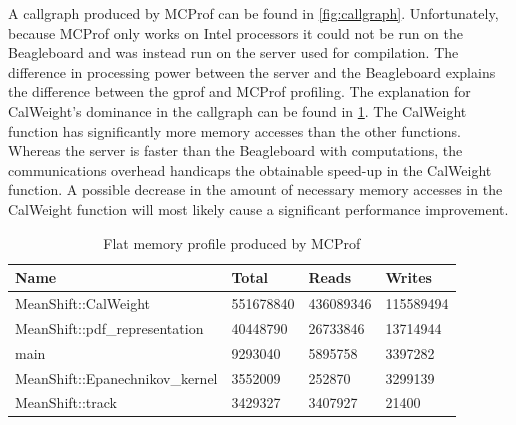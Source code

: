 \documentclass[final]{article}
\begin{document}
A callgraph produced by MCProf can be found in \cref{fig:callgraph}. Unfortunately, because MCProf only works on Intel processors it could not be run on the Beagleboard and was instead run on the server used for compilation. The difference in processing power between the server and the Beagleboard explains the difference between the gprof and MCProf profiling. The explanation for CalWeight's dominance in the callgraph can be found in \cref{tab:memprofile}. The CalWeight function has significantly more memory accesses than the other functions. Whereas the server is faster than the Beagleboard with computations, the communications overhead handicaps the obtainable speed-up in the CalWeight function. A possible decrease in the amount of necessary memory accesses in the CalWeight function will most likely cause a significant performance improvement.

\begin{table}[H]
\centering
\caption{Flat memory profile produced by MCProf}
\label{tab:memprofile}
\begin{tabular}{llll}
\toprule
\textbf{Name} & \textbf{Total} & \textbf{Reads} & \textbf{Writes}\\
\midrule
MeanShift::CalWeight   &  551678840  &   436089346   &  115589494\\
MeanShift::pdf\_representation    &  40448790  &    26733846   &   13714944\\
main   &    9293040   &    5895758    &  3397282\\
MeanShift::Epanechnikov\_kernel    &   3552009       & 252870  &     3299139\\
MeanShift::track   &    3429327   &    3407927      &   21400\\
\bottomrule
\end{tabular}
\end{table}
\end{document}

